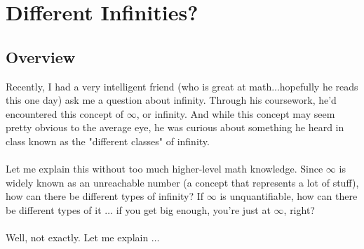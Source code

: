 
\section{Different Infinities?}
\subsection{Overview}
Recently, I had a very intelligent friend (who is great at math...hopefully he reads this one day) ask me a question about infinity.
Through his coursework, he'd encountered this concept of $\infty$, or infinity. 
And while this concept may seem pretty obvious to the average eye, he was curious about something he heard in class known as the "different classes" of infinity. \\
\\
Let me explain this without too much higher-level math knowledge.
Since $\infty$ is widely known as an unreachable number (a concept that represents a lot of stuff), how can there be different types of infinity?
If $\infty$ is unquantifiable, how can there be different types of it $\dots$ if you get big enough, you're just at $\infty$, right? \\
\\
Well, not exactly. Let me explain $\dots$
